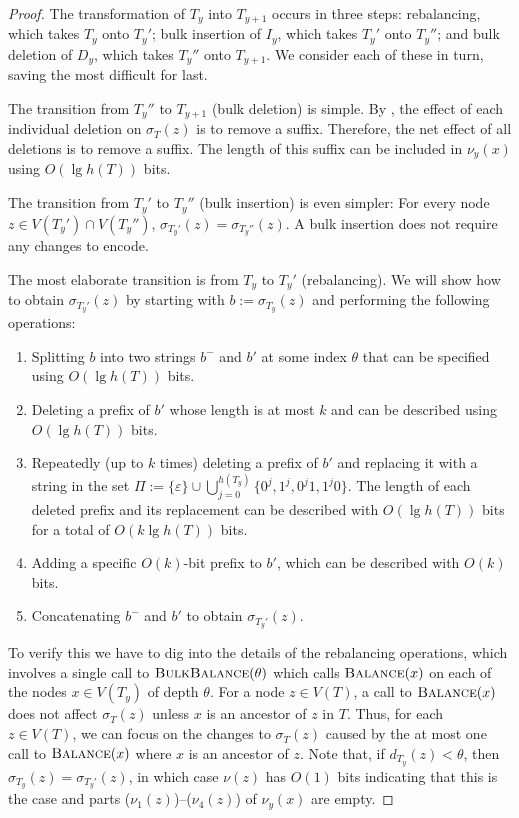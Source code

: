 \documentclass[kpfonts]{patmorin}
\begin{document}
\begin{proof}
  The transformation of $T_{y}$ into $T_{y+1}$ occurs in three steps: rebalancing, which takes $T_y$ onto $T_y'$; bulk insertion of $I_y$, which takes $T_y'$ onto $T_y''$; and bulk deletion of $D_y$, which takes $T_y''$ onto $T_{y+1}$.  We consider each of these in turn, saving the most difficult for last.
  
  The transition from $T_y''$ to $T_{y+1}$ (bulk deletion) is simple.  By , the effect of each individual deletion on $\sigma_T(z)$ is to remove a suffix.  Therefore, the net effect of all deletions is to remove a suffix.  The length of this suffix can be included in $\nu_y(x)$ using $O(\lg h(T))$ bits.
  
  The transition from $T_y'$ to $T_y''$ (bulk insertion) is even simpler: For every node $z\in V(T_y')\cap V(T_y'')$, $\sigma_{T_y'}(z)=\sigma_{T_y''}(z)$.  A bulk insertion does not require any changes to encode.
  
  The most elaborate transition is from $T_y$ to $T_y'$ (rebalancing).  We will show how to obtain $\sigma_{T_y'}(z)$ by starting with $b:=\sigma_{T_y}(z)$ and performing the following operations:
  \begin{enumerate}[($\nu_1$)]
    \item Splitting $b$ into two strings $b^-$ and $b'$ at some index $\theta$ that can be specified using $O(\lg h(T))$ bits.
    \item Deleting a prefix of $b'$ whose length is at most $k$ and can be described using $O(\lg h(T))$ bits.
    \item Repeatedly (up to $k$ times) deleting a prefix of $b'$ and replacing it with a string in the set $\Pi:=\{\varepsilon\}\cup\bigcup_{j=0}^{h(T_y)}\{0^j, 1^j, 0^j1, 1^j0\}$. The length of each deleted prefix and its replacement can be described with $O(\lg h(T))$ bits for a total of $O(k\lg h(T))$ bits.
    \item Adding a specific $O(k)$-bit prefix to $b'$, which can be described with $O(k)$ bits.
    \item Concatenating $b^-$ and $b'$ to obtain $\sigma_{T_y'}(z)$.
  \end{enumerate}
  To verify this we have to dig into the details of the rebalancing operations, which involves a single call to $\textsc{BulkBalance}(\theta)$ which calls $\textsc{Balance}(x)$ on each of the nodes $x\in V(T_y)$ of depth $\theta$.    
  For a node $z\in V(T)$, a call to $\textsc{Balance}(x)$ does not affect $\sigma_T(z)$ unless $x$ is an ancestor of $z$ in $T$.  Thus, for each $z\in V(T)$, we can focus on the changes to $\sigma_T(z)$ caused by the at most one call to $\textsc{Balance}(x)$ where $x$ is an ancestor of $z$. Note that, if $d_{T_y}(z)<\theta$, then $\sigma_{T_y}(z)=\sigma_{T_y'}(z)$, in which case $\nu(z)$ has $O(1)$ bits indicating that this is the case and parts ($\nu_1(z)$)--($\nu_4(z)$) of $\nu_y(x)$ are empty.
  

\end{proof}
\end{document}
